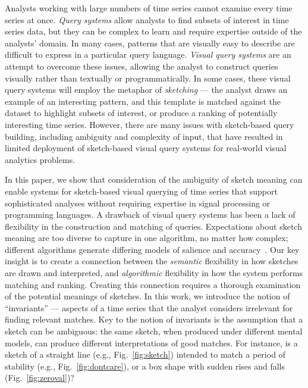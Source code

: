 
\invariancesFig

Analysts working with large numbers of time series cannot examine every time series at once. \emph{Query systems} allow analysts to find subsets of interest in time series data, but they can be complex to learn and require expertise outside of the analysts' domain. In many cases, patterns that are visually easy to describe are difficult to express in a particular query language. \emph{Visual query systems} are an attempt to overcome these issues, allowing the analyst to construct queries visually rather than textually or programmatically. In some cases, these visual query systems will employ the metaphor of \emph{sketching} --- the analyst draws an example of an interesting pattern, and this template is matched against the dataset to highlight subsets of interest, or produce a ranking of potentially interesting time series. However, there are many issues with sketch-based query building, including ambiguity and complexity of input, that have resulted in limited deployment of sketch-based visual query systems for real-world visual analytics problems.

In this paper, we show that consideration of the ambiguity of sketch meaning can enable systems for sketch-based visual querying of time series that support sophisticated analyses without requiring expertise in signal processing or programming languages. A drawback of visual query systems has been a lack of flexibility in the construction and matching of queries. Expectations about sketch meaning are too diverse to capture in one algorithm, no matter how complex; different algorithms generate differing models of salience and accuracy~\cite{eichmann2015evaluating}. Our key insight is to create a connection between the \emph{semantic} flexibility in how sketches are drawn and interpreted, and \emph{algorithmic} flexibility in how the system performs matching and ranking. Creating this connection requires a thorough examination of the potential meanings of sketches. In this work, we introduce the notion of ``invariants'' --- aspects of a time series that the analyst considers irrelevant for finding relevant matches. Key to the notion of invariants is the assumption that a sketch can be ambiguous: the same sketch, when produced under different mental models, can produce different interpretations of good matches. For instance, is a sketch of a straight line (e.g., Fig.~\ref{fig:sketch}) intended to match a period of stability (e.g., Fig.~\ref{fig:dontcare}), or a box shape with sudden rises and falls (Fig.~\ref{fig:zeroval})? 

